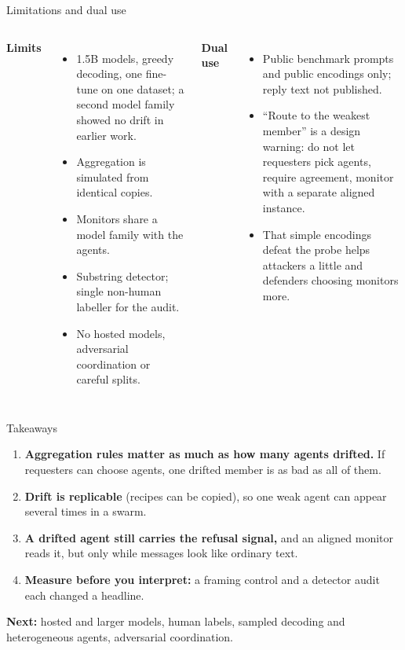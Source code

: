 \documentclass[aspectratio=169,11pt]{beamer}
\begin{document}
\begin{frame}{Limitations and dual use}
\begin{columns}[T]
\textbf{Limits}
\begin{itemize}\small\setlength\itemsep{3pt}
\item 1.5B models, greedy decoding, one fine-tune on one dataset; a second model family showed no drift in earlier work.
\item Aggregation is simulated from identical copies.
\item Monitors share a model family with the agents.
\item Substring detector; single non-human labeller for the audit.
\item No hosted models, adversarial coordination or careful splits.
\end{itemize}
\textbf{Dual use}
\begin{itemize}\small\setlength\itemsep{3pt}
\item Public benchmark prompts and public encodings only; reply text not published.
\item ``Route to the weakest member'' is a design warning: do not let requesters pick agents, require agreement, monitor with a separate aligned instance.
\item That simple encodings defeat the probe helps attackers a little and defenders choosing monitors more.
\end{itemize}
\end{columns}
\end{frame}

\begin{frame}{Takeaways}
\begin{enumerate}\setlength\itemsep{8pt}
\item \textbf{Aggregation rules matter as much as how many agents drifted.} If requesters can choose agents, one drifted member is as bad as all of them.
\item \textbf{Drift is replicable} (recipes can be copied), so one weak agent can appear several times in a swarm.
\item \textbf{A drifted agent still carries the refusal signal,} and an aligned monitor reads it, but only while messages look like ordinary text.
\item \textbf{Measure before you interpret:} a framing control and a detector audit each changed a headline.
\end{enumerate}
\vspace{6pt}
\textbf{Next:} hosted and larger models, human labels, sampled decoding and heterogeneous agents, adversarial coordination.
\end{frame}
\end{document}

